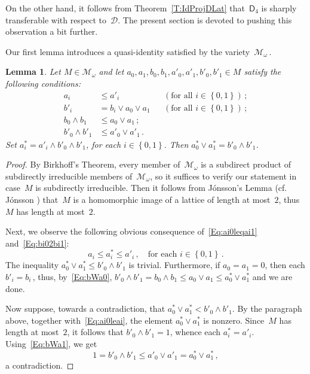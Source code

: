 \documentclass[reqno]{amsart}
\numberwithin{equation}{section}
\theoremstyle{plain}
\newtheorem{lemma}[theorem]{Lemma}
\theoremstyle{definition}
\theoremstyle{remark}
\numberwithin{figure}{section}
\numberwithin{table}{section}
\begin{document}
On the other hand, it follows from Theorem~\ref{T:IdProjDLat} that~${\mathsf{D}_{4}}$ is sharply transferable with respect to~${\mathcal{D}}$.
The present section is devoted to pushing this observation a bit further.

Our first lemma introduces a quasi-identity satisfied by the variety~${\mathcal{M}}_{\omega}$\,.

\begin{lemma}\label{L:QuasiIdMgo}
Let $M\in{\mathcal{M}}_{\omega}$ and let $a_0,a_1,b_0,b_1,a'_0,a'_1,b'_0,b'_1\in M$ satisfy the following conditions:
 \begin{align}
 a_i&\leq a'_i
 &&(\text{for all }i\in{\left\{{0,1}\right\}})\,;\label{Eq:ai0leqai1}\\
 b'_i&=b_i\vee a_0\vee a_1
 &&(\text{for all }i\in{\left\{{0,1}\right\}})\,;\label{Eq:bi02bi1}\\
 b_0\wedge b_1&\leq a_0\vee a_1\,;\label{Eq:bWa0}\\
 b'_0\wedge b'_1&\leq a'_0\vee a'_1\,.\label{Eq:bWa1}
 \end{align}
Set $a^*_i=a'_i\wedge b'_0\wedge b'_1$, for each $i\in{\left\{{0,1}\right\}}$.
Then $a^*_0\vee a^*_1=b'_0\wedge b'_1$.
\end{lemma}

\begin{proof}
By Birkhoff's Theorem, every member of~${\mathcal{M}}_{\omega}$ is a subdirect product of subdirectly irreducible members of~${\mathcal{M}}_{\omega}$, so it suffices to verify our statement in case~$M$ is subdirectly irreducible.
Then it follows from J\'onsson's Lemma (cf. J\'onsson \cite[Corollary~3.2]{Jons67}) that~$M$ is a homomorphic image of a lattice of length at most~$2$, thus~$M$ has length at most~$2$.

Next, we observe the following obvious consequence of~\eqref{Eq:ai0leqai1} and~\eqref{Eq:bi02bi1}:
 \begin{equation}\label{Eq:ai0leai}
 a_i\leq a^*_i\leq a'_i\,,\quad\text{for each }i\in{\left\{{0,1}\right\}}\,.
 \end{equation}
The inequality $a^*_0\vee a^*_1\leq b'_0\wedge b'_1$ is trivial.
Furthermore, if $a_0=a_1=0$, then each $b'_i=b_i$\,, thus, by~\eqref{Eq:bWa0}, $b'_0\wedge b'_1=b_0\wedge b_1
\leq a_0\vee a_1\leq a^*_0\vee a^*_1$ and we are done.

Now suppose, towards a contradiction, that $a^*_0\vee a^*_1<b'_0\wedge b'_1$.
By the paragraph above, together with~\eqref{Eq:ai0leai}, the element $a^*_0\vee a^*_1$ is nonzero.
Since~$M$ has length at most~$2$, it follows that $b'_0\wedge b'_1=1$, whence each $a^*_i=a'_i$.
Using~\eqref{Eq:bWa1}, we get
 \[
 1=b'_0\wedge b'_1\leq a'_0\vee a'_1
 =a^*_0\vee a^*_1\,,
 \]
a contradiction.
\end{proof}
\end{document}
